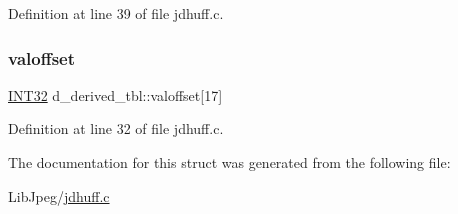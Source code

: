 Definition at line 39 of file jdhuff.\+c.

\mbox{\label{structd__derived__tbl_a67397b3869145321a25d2df17a0c11ec}} 
\subsubsection{\texorpdfstring{valoffset}{valoffset}}
{\footnotesize\ttfamily \mbox{\hyperlink{jmorecfg_8h_a0cb58e7e6f0bad369840a52e54a56ae0}{I\+N\+T32}} d\+\_\+derived\+\_\+tbl\+::valoffset\mbox{[}17\mbox{]}}



Definition at line 32 of file jdhuff.\+c.



The documentation for this struct was generated from the following file\+:\begin{DoxyCompactItemize}
\item 
Lib\+Jpeg/\mbox{\hyperlink{jdhuff_8c}{jdhuff.\+c}}\end{DoxyCompactItemize}
